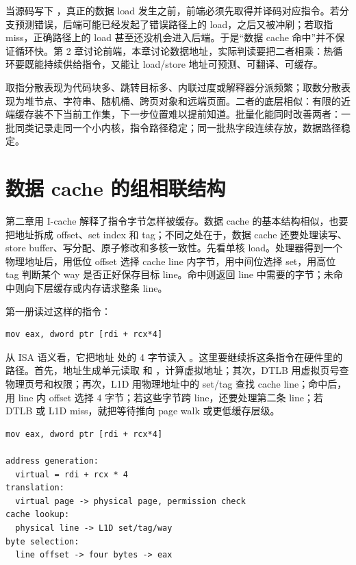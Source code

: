 当源码写下 ，真正的数据 load 发生之前，前端必须先取得并译码对应指令。若分支预测错误，后端可能已经发起了错误路径上的 load，之后又被冲刷；若取指 miss，正确路径上的 load 甚至还没机会进入后端。于是“数据 cache 命中”并不保证循环快。第 2 章讨论前端，本章讨论数据地址，实际判读要把二者相乘：热循环要既能持续供给指令，又能让 load/store 地址可预测、可翻译、可缓存。

取指分散表现为代码块多、跳转目标多、内联过度或解释器分派频繁；取数分散表现为堆节点、字符串、随机桶、跨页对象和远端页面。二者的底层相似：有限的近端缓存装不下当前工作集，下一步位置难以提前知道。批量化能同时改善两者：一批同类记录走同一个小内核，指令路径稳定；同一批热字段连续存放，数据路径稳定。

\section{数据 cache 的组相联结构}

第二章用 I-cache 解释了指令字节怎样被缓存。数据 cache 的基本结构相似，也要把地址拆成 offset、set index 和 tag；不同之处在于，数据 cache 还要处理读写、store buffer、写分配、原子修改和多核一致性。先看单核 load。处理器得到一个物理地址后，用低位 offset 选择 cache line 内字节，用中间位选择 set，用高位 tag 判断某个 way 是否正好保存目标 line。命中则返回 line 中需要的字节；未命中则向下层缓存或内存请求整条 line。

第一册读过这样的指令：

\begin{lstlisting}[numbers=none,caption={一个普通数组 load 的汇编形状}]
mov eax, dword ptr [rdi + rcx*4]
\end{lstlisting}

从 ISA 语义看，它把地址  处的 4 字节读入 。这里要继续拆这条指令在硬件里的路径。首先，地址生成单元读取  和 ，计算虚拟地址；其次，DTLB 用虚拟页号查物理页号和权限；再次，L1D 用物理地址中的 set/tag 查找 cache line；命中后，用 line 内 offset 选择 4 字节；若这些字节跨 line，还要处理第二条 line；若 DTLB 或 L1D miss，就把等待推向 page walk 或更低缓存层级。

\begin{lstlisting}[numbers=none,caption={把一条 load 汇编展开成硬件问题}]
mov eax, dword ptr [rdi + rcx*4]

address generation:
  virtual = rdi + rcx * 4
translation:
  virtual page -> physical page, permission check
cache lookup:
  physical line -> L1D set/tag/way
byte selection:
  line offset -> four bytes -> eax
\end{lstlisting}

